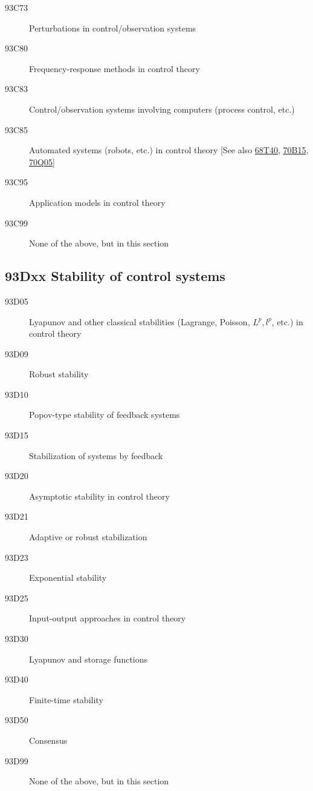 \begin{description}
\item [93C73]\label{93C73} Perturbations in control/observation systems
\item [93C80]\label{93C80} Frequency-response methods in control theory
\item [93C83]\label{93C83} Control/observation systems involving computers (process control, etc.)
\item [93C85]\label{93C85} Automated systems (robots, etc.) in control theory [See also \hyperref[68T40]{68T40}, \hyperref[70B15]{70B15}, \hyperref[70Q05]{70Q05}]
\item [93C95]\label{93C95} Application models in control theory
\item [93C99]\label{93C99} None of the above, but in this section
\end{description}
\subsection*{93Dxx  Stability of control systems}\label{93Dxx}
\begin{description}  
\item [93D05]\label{93D05} Lyapunov and other classical stabilities (Lagrange, Poisson, $L^p, l^p$, etc.) in control theory 
\item [93D09]\label{93D09} Robust stability  
\item [93D10]\label{93D10} Popov-type stability of feedback systems
\item [93D15]\label{93D15} Stabilization of systems by feedback
\item [93D20]\label{93D20} Asymptotic stability in control theory  
\item [93D21]\label{93D21} Adaptive or robust stabilization 
\item [93D23]\label{93D23} Exponential stability
\item [93D25]\label{93D25} Input-output approaches in control theory  
\item [93D30]\label{93D30} Lyapunov and storage functions  
\item [93D40]\label{93D40} Finite-time stability 
\item [93D50]\label{93D50} Consensus
\item [93D99]\label{93D99} None of the above, but in this section
\end{description}
